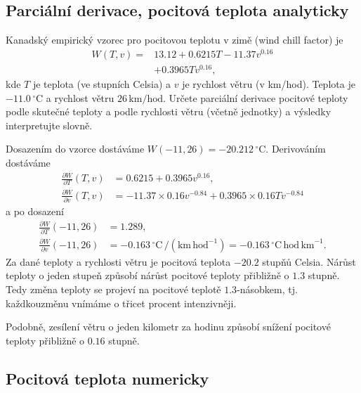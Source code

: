 \konec



\subsection{Parciální derivace, pocitová teplota analyticky}
\shorthandoff{-}

Kanadský empirický vzorec pro pocitovou teplotu v zimě (wind chill factor) je
$$
\begin{aligned}
W(T,v) = &13.12+0.6215 T-11.37 v^{0.16}\\&+0.3965 T v^{0.16},
\end{aligned}
$$
kde $T$ je teplota
(ve stupních Celsia) a $v$ je rychlost větru (v km/hod). Teplota je $-11.0\,{}^\circ\!\text{C}$  a rychlost větru $26
\,\text{km/hod}$. Určete parciální derivace pocitové teploty podle skutečné teploty a podle rychlosti větru (včetně jednotky) a výsledky interpretujte slovně.

\reseni

Dosazením do vzorce dostáváme $W(-11,26)=-20.212\,{}^\circ\!\text{C}$. Derivováním dostáváme
$$\begin{aligned}\frac{\partial W}{\partial T}(T,v)&=0.6215+0.3965 v^{0.16},\\
\frac{\partial W}{\partial v}(T,v)&=-11.37\times 0.16 v^{-0.84}+0.3965 \times 0.16 Tv^{-0.84}
\end{aligned}
$$
a po dosazení
$$\begin{aligned}\frac{\partial W}{\partial T}(-11,26)&=1.289,\\
\frac{\partial W}{\partial v}(-11,26)&=-0.163 \,{}^\circ\!\text{C}\, /(\mathrm{km}\, \text{hod}^{-1})=-0.163 \,{}^\circ\!\text{C}\, \text{hod} \,\mathrm{km}^{-1}.
\end{aligned}
$$
Za dané teploty a rychlosti větru je pocitová teplota $-20.2$ stupňů
Celsia. Nárůst teploty o jeden stupeň způsobí nárůst pocitové teploty
přibližně o $1.3$ stupně. Tedy změna teploty se projeví na pocitové
teplotě $1.3$-násobkem, tj. každkouzměnu vnímáme o třicet procent
intenzivněji.

Podobně, zesílení větru o jeden kilometr za hodinu způsobí snížení
pocitové teploty přibližně o $0.16$ stupně.

\konec

\subsection{Pocitová teplota numericky}

